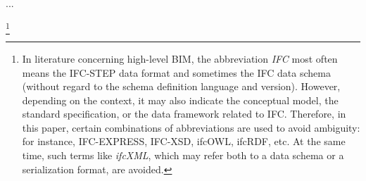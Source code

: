 
 








...



\footnote{
In literature concerning high-level BIM, the abbreviation \emph{IFC} most often means the IFC-STEP data format and sometimes the IFC data schema (without regard to the schema definition language and version).
However, depending on the context, it may also indicate the conceptual model, the standard specification, or the data framework related to IFC.
Therefore, in this paper, certain combinations of abbreviations are used to avoid ambiguity: for instance, IFC-EXPRESS, IFC-XSD, ifcOWL, ifcRDF, etc.
At the same time, such terms like \emph{ifcXML}, which may refer both to a data schema or a serialization format, are avoided.
}